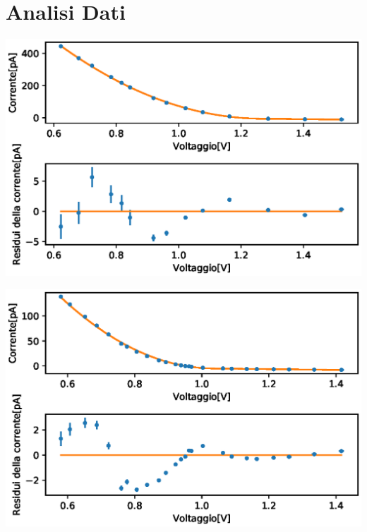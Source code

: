 \documentclass[10pt,a4paper]{article}
\begin{document}
\section*{Analisi Dati}
\begin{minipage}{.6\linewidth}
		\centering
		\includegraphics[width=\linewidth]{immagini/450nm.eps}
		\label{fig:circuito-1}
	\end{minipage}
	\begin{minipage}{.4\linewidth}
		
		\label{tab:124}
\end{minipage}\newline\newline
\begin{minipage}{.6\linewidth}
		\centering
		\includegraphics[width=\linewidth]{immagini/499nm.eps}
		\label{fig:circuito-1}
	\end{minipage}
\end{document}

